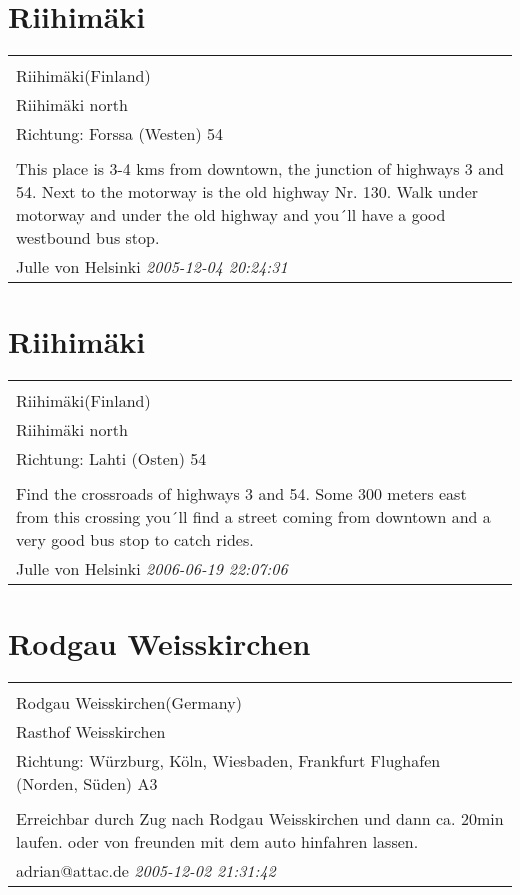 \documentclass[a4paper,12pt]{article}
\begin{document}
\section{Riihimäki}
\begin{tabular}{|p{13cm}|}
\hline\\
Riihimäki(Finland)\\
Riihimäki north\\
Richtung: Forssa (Westen) 54 \\
\hline\\
This place is 3-4 kms from downtown, the junction of highways 3 and 54. Next to the motorway is the old highway Nr. 130. Walk under motorway and under the old highway and you´ll have a good westbound bus stop. \\
Julle von Helsinki \textit{ 2005-12-04 20:24:31 }\\\hline
\end{tabular}


\section{Riihimäki}
\begin{tabular}{|p{13cm}|}
\hline\\
Riihimäki(Finland)\\
Riihimäki north\\
Richtung: Lahti (Osten) 54 \\
\hline\\
Find the crossroads of highways 3 and 54. Some 300 meters east from this crossing you´ll find a street coming from downtown and a very good bus stop to catch rides. \\
Julle von Helsinki \textit{ 2006-06-19 22:07:06 }\\\hline
\end{tabular}


\section{Rodgau Weisskirchen}
\begin{tabular}{|p{13cm}|}
\hline\\
Rodgau Weisskirchen(Germany)\\
Rasthof Weisskirchen\\
Richtung: Würzburg, Köln, Wiesbaden, Frankfurt Flughafen (Norden, Süden) A3 \\
\hline\\
Erreichbar durch Zug nach Rodgau Weisskirchen und dann ca. 20min laufen. oder von freunden mit dem auto hinfahren lassen. \\
adrian@attac.de \textit{ 2005-12-02 21:31:42 }\\\hline
\end{tabular}
\end{document}
